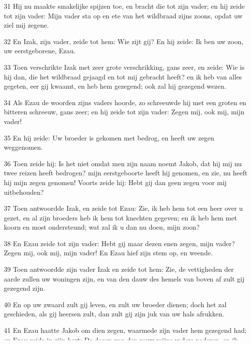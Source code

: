 \par 31 Hij nu maakte smakelijke spijzen toe, en bracht die tot zijn vader; en hij zeide tot zijn vader: Mijn vader sta op en ete van het wildbraad zijns zoons, opdat uw ziel mij zegene.
\par 32 En Izak, zijn vader, zeide tot hem: Wie zijt gij? En hij zeide: Ik ben uw zoon, uw eerstgeborene, Ezau.
\par 33 Toen verschrikte Izak met zeer grote verschrikking, gans zeer, en zeide: Wie is hij dan, die het wildbraad gejaagd en tot mij gebracht heeft? en ik heb van alles gegeten, eer gij kwaamt, en heb hem gezegend; ook zal hij gezegend wezen.
\par 34 Als Ezau de woorden zijns vaders hoorde, zo schreeuwde hij met een groten en bitteren schreeuw, gans zeer; en hij zeide tot zijn vader: Zegen mij, ook mij, mijn vader!
\par 35 En hij zeide: Uw broeder is gekomen met bedrog, en heeft uw zegen weggenomen.
\par 36 Toen zeide hij: Is het niet omdat men zijn naam noemt Jakob, dat hij mij nu twee reizen heeft bedrogen? mijn eerstgeboorte heeft hij genomen, en zie, nu heeft hij mijn zegen genomen! Voorts zeide hij: Hebt gij dan geen zegen voor mij uitbehouden?
\par 37 Toen antwoordde Izak, en zeide tot Ezau: Zie, ik heb hem tot een heer over u gezet, en al zijn broeders heb ik hem tot knechten gegeven; en ik heb hem met koorn en most ondersteund; wat zal ik u dan nu doen, mijn zoon?
\par 38 En Ezau zeide tot zijn vader: Hebt gij maar dezen enen zegen, mijn vader? Zegen mij, ook mij, mijn vader! En Ezau hief zijn stem op, en weende.
\par 39 Toen antwoordde zijn vader Izak en zeide tot hem: Zie, de vettigheden der aarde zullen uw woningen zijn, en van den dauw des hemels van boven af zult gij gezegend zijn.
\par 40 En op uw zwaard zult gij leven, en zult uw broeder dienen; doch het zal geschieden, als gij heersen zult, dan zult gij zijn juk van uw hals afrukken.
\par 41 En Ezau haatte Jakob om dien zegen, waarmede zijn vader hem gezegend had; en Ezau zeide in zijn hart: De dagen van den rouw mijns vaders naderen, en ik zal mijn broeder Jakob doden.
\par 42 Toen aan Rebekka deze woorden van Ezau, haar grootsten zoon, geboodschapt werden, zo zond zij heen, en ontbood Jakob, haar kleinsten zoon, en zeide tot hem: Zie, uw broeder Ezau troost zich over u, dat hij u doden zal.
